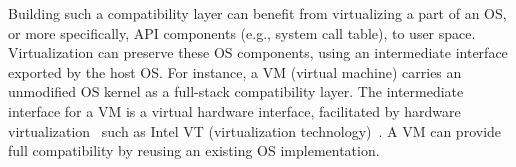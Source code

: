 %



Building such a compatibility layer
can benefit from virtualizing 
a part of an OS, or more specifically, API components (e.g., system call table), to user space.
Virtualization can preserve these OS components,
using an intermediate interface
exported by the host OS.
For instance, a VM (virtual machine) carries an unmodified OS kernel
as a full-stack compatibility layer.
The intermediate interface for a VM
is a virtual hardware interface,
facilitated by hardware virtualization~\cite{popek74virtual}
such as Intel VT (virtualization technology)~\cite{VT}.
A VM can provide full compatibility
by reusing an existing OS implementation.


